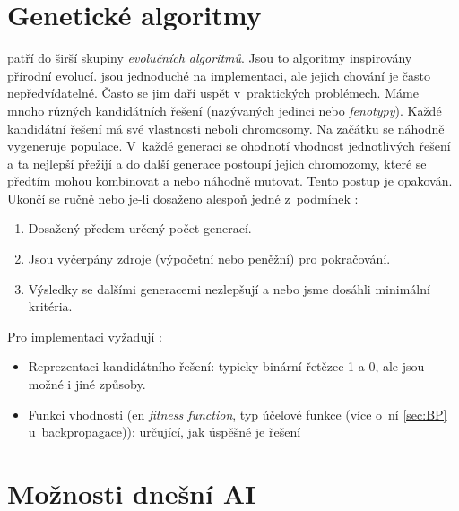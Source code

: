\documentclass[12pt]{report}			%
\begin{document}
	\section{Genetické algoritmy}	
	\label{sec:genetic} 
	 patří do širší skupiny \emph{evolučních algoritmů}. Jsou to algoritmy inspirovány přírodní evolucí.  jsou jednoduché na implementaci, ale jejich chování je často nepředvídatelné. Často se jim daří uspět v~praktických problémech. Máme mnoho různých kandidátních řešení (nazývaných jedinci nebo \emph{fenotypy}). Každé kandidátní řešení má své vlastnosti neboli chromosomy. Na začátku se náhodně vygeneruje populace. V~každé generaci se ohodnotí vhodnost jednotlivých řešení a ta nejlepší přežijí a do další generace postoupí jejich chromozomy, které se předtím mohou kombinovat a nebo náhodně mutovat. Tento postup je opakován. Ukončí se ručně nebo je-li dosaženo alespoň jedné z~podmínek  \parencite[\gls{str} 50-53]{chaudhuri2017optical} :
	\begin{enumerate}
	\item{Dosažený předem určený počet generací.}
	\item{Jsou vyčerpány zdroje (výpočetní nebo peněžní) pro pokračování.}
	\item{Výsledky se dalšími generacemi nezlepšují a nebo jsme dosáhli minimální kritéria.}
	\end{enumerate}
	Pro implementaci vyžadují \parencite[\gls{str} 50-53]{chaudhuri2017optical}:
	\begin{itemize}
	\item{Reprezentaci kandidátního řešení: typicky binární řetězec 1 a 0, ale jsou možné i jiné způsoby.}
	\item{Funkci vhodnosti (\gls{en} \emph{fitness function}, typ účelové funkce (více o~ní \ref{sec:BP} u~backpropagace)): určující, jak úspěšné je řešení}
	\end{itemize}





	
	
	\section{Možnosti dnešní \gls{AI}}
	\label{sec:AI-now} %
	
\end{document}
